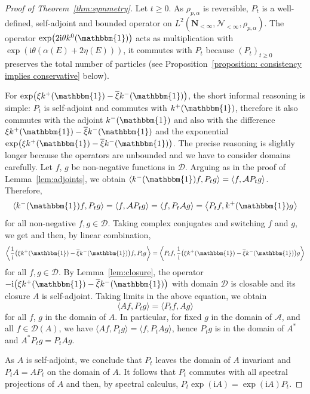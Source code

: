 \documentclass[pdftex]{sigma}
\numberwithin{equation}{section}
\newcommand{\1}{\mathbbm{1}}
\begin{document}
\begin{proof}[Proof of Theorem~\ref{thm:symmetry}]
	Let $t \geq 0$. As $\rho_{p,\alpha}$ is reversible, $P_t$ is a well-defined, self-adjoint and bounded operator on $L^2(\mathbf N_{<\infty}, \mathcal N_{<\infty}, \rho_{p, \alpha})$. The operator $\exp\bigl(2 \mathrm i \theta k^0(\1)\bigr)$ acts as multiplication with $\exp( \mathrm i \theta (\alpha(E) + 2\eta(E)))$, it commutes with $P_t$ because $(P_t)_{t \geq 0}$ preserves the total number of particles (see Proposition~\ref{proposition: consistency implies conservative} below).
	
		For $\exp\bigl( \xi k^+(\1) - \overline{\xi} k^-(\1)\bigr)$, the short informal reasoning is simple: $P_t$ is self-adjoint and commutes with $k^+(\1)$, therefore it also commutes with the adjoint $k^-(\1)$ and also with the difference $\xi k^+(\1) - \overline{\xi} k^-(\1)$ and the exponential $\exp\bigl( \xi k^+(\1) - \overline{\xi} k^-(\1)\bigr)$. The precise reasoning is slightly longer because the operators are unbounded and we have to consider domains carefully. Let $f$, $g$ be non-negative functions in $\mathcal D$. Arguing as in the proof of Lemma~\ref{lem:adjoints}, we obtain $\langle k^-(\1) f, P_t g\rangle = \langle f, \mathcal A P_t g \rangle$. Therefore,
	\[
		\langle k^-(\1) f, P_t g\rangle = \langle f, \mathcal A P_t g \rangle = \langle f, P_t \mathcal A g\rangle = \bigl\langle P_t f, k^+(\1) g\bigr\rangle
	\]
	for all non-negative $f,g\in \mathcal D$. 	Taking complex conjugates and switching $f$ and $g$, we get \smash{$\bigl\langle k^+(\1) f, P_t g \bigr\rangle = \langle P_t f, k^-(\1) g\rangle $} and then, by linear combination,
	\[
		\biggl \langle \frac 1{\mathrm i} \bigl(\xi k^+(\1) - \overline{\xi} k^-(\1)\bigr) f, P_t g\biggr \rangle =
		\biggl \langle P_t f, \frac 1{\mathrm i} \bigl(\xi k^+(\1) - \overline{\xi} k^-(\1)\bigr) g\biggr \rangle
	\]
	for all $f,g\in \mathcal D$. By Lemma~\ref{lem:closure}, the operator $- \mathrm {i}\bigl(\xi k^+(\1) - \overline{\xi} k^-(\1) \bigr)$ with domain $\mathcal D$ is closable and its closure $A$ is self-adjoint. 	
	Taking limits in the above equation, we obtain
	\[
		\langle A f, P_t g \rangle = \langle P_t f, A g\rangle
	\]
	for all $f$, $g$ in the domain of $A$. In particular, for fixed $g$ in the domain of $\mathcal A$, and all $f\in \mathcal D(A)$, we have $\langle A f, P_t g\rangle = \langle f, P_t A g \rangle$, hence $P_tg$ is in the domain of $A^*$ and $A^* P_t g = P_t A g$.
	
	As $A$ is self-adjoint, we conclude that $P_t$ leaves the domain of $A$ invariant and $P_t A = A P_t$ on the domain of $A$.
It follows that $P_t$ commutes with all spectral projections of $A$ \cite[Proposition~5.26]{schmudgen2012unbounded} and then, by spectral calculus, $P_t \exp(\mathrm i A) = \exp(\mathrm i A) P_t$. 	
\end{proof}
\end{document}
